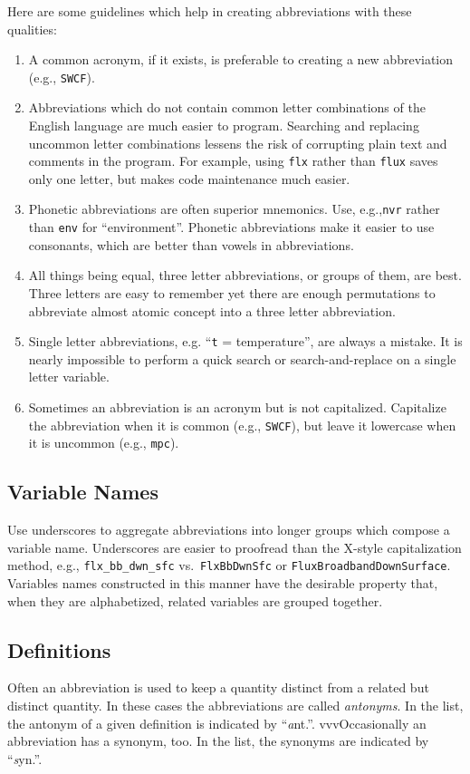 \documentclass[12pt,twoside]{article}
\begin{document}
Here are some guidelines which help in creating abbreviations with
these qualities: 
\begin{enumerate}
\item A common acronym, if it exists, is preferable to creating a new
abbreviation (e.g., \verb'SWCF').
\item Abbreviations which do not contain common letter combinations of the
English language are much easier to program.
Searching and replacing uncommon letter combinations lessens the risk
of corrupting plain text and comments in the program. 
For example, using \verb'flx' rather than \verb'flux' saves only one
letter, but makes code maintenance much easier. 
\item Phonetic abbreviations are often superior mnemonics.
Use, e.g.,\verb'nvr' rather than \verb'env' for ``environment''.
Phonetic abbreviations make it easier to use consonants, which are
better than vowels in abbreviations.
\item All things being equal, three letter abbreviations, or groups of
them, are best.
Three letters are easy to remember yet there are enough permutations
to abbreviate almost atomic concept into a three letter abbreviation.
\item Single letter abbreviations, e.g. ``\verb't' = temperature'',
are always a mistake. 
It is nearly impossible to perform a quick search or
search-and-replace on a single letter variable.
\item Sometimes an abbreviation is an acronym but is not capitalized.
Capitalize the abbreviation when it is common (e.g., \verb'SWCF'), but
leave it lowercase when it is uncommon (e.g., \verb'mpc'). 
\end{enumerate}

\subsection{Variable Names}
Use underscores to aggregate abbreviations into longer groups which
compose a variable name.
Underscores are easier to proofread than the X-style capitalization 
method, e.g., \verb'flx_bb_dwn_sfc' vs.\ \verb'FlxBbDwnSfc' or
\verb'FluxBroadbandDownSurface'.  
Variables names constructed in this manner have the desirable property
that, when they are alphabetized, related variables are grouped
together. 

\subsection{Definitions}
Often an abbreviation is used to keep a quantity distinct from a
related but distinct quantity. 
In these cases the abbreviations are called \textit{antonyms}.
In the list, the antonym of a given definition is indicated by
``{\textit ant.}''.
vvvOccasionally an abbreviation has a synonym, too.
In the list, the synonyms are indicated by ``{\textit syn.}''.
\end{document}
